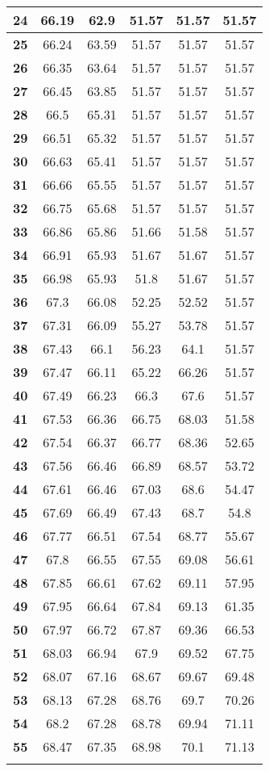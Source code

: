 \begin{longtable}{|c|c|c|c|c|c|}
\textbf{24} & 66.19 & 62.9 & 51.57 & 51.57 & 51.57 \\ \hline 
\textbf{25} & 66.24 & 63.59 & 51.57 & 51.57 & 51.57 \\ \hline 
\textbf{26} & 66.35 & 63.64 & 51.57 & 51.57 & 51.57 \\ \hline 
\textbf{27} & 66.45 & 63.85 & 51.57 & 51.57 & 51.57 \\ \hline 
\textbf{28} & 66.5 & 65.31 & 51.57 & 51.57 & 51.57 \\ \hline 
\textbf{29} & 66.51 & 65.32 & 51.57 & 51.57 & 51.57 \\ \hline 
\textbf{30} & 66.63 & 65.41 & 51.57 & 51.57 & 51.57 \\ \hline 
\textbf{31} & 66.66 & 65.55 & 51.57 & 51.57 & 51.57 \\ \hline 
\textbf{32} & 66.75 & 65.68 & 51.57 & 51.57 & 51.57 \\ \hline 
\textbf{33} & 66.86 & 65.86 & 51.66 & 51.58 & 51.57 \\ \hline 
\textbf{34} & 66.91 & 65.93 & 51.67 & 51.67 & 51.57 \\ \hline 
\textbf{35} & 66.98 & 65.93 & 51.8 & 51.67 & 51.57 \\ \hline 
\textbf{36} & 67.3 & 66.08 & 52.25 & 52.52 & 51.57 \\ \hline 
\textbf{37} & 67.31 & 66.09 & 55.27 & 53.78 & 51.57 \\ \hline 
\textbf{38} & 67.43 & 66.1 & 56.23 & 64.1 & 51.57 \\ \hline 
\textbf{39} & 67.47 & 66.11 & 65.22 & 66.26 & 51.57 \\ \hline 
\textbf{40} & 67.49 & 66.23 & 66.3 & 67.6 & 51.57 \\ \hline 
\textbf{41} & 67.53 & 66.36 & 66.75 & 68.03 & 51.58 \\ \hline 
\textbf{42} & 67.54 & 66.37 & 66.77 & 68.36 & 52.65 \\ \hline 
\textbf{43} & 67.56 & 66.46 & 66.89 & 68.57 & 53.72 \\ \hline 
\textbf{44} & 67.61 & 66.46 & 67.03 & 68.6 & 54.47 \\ \hline 
\textbf{45} & 67.69 & 66.49 & 67.43 & 68.7 & 54.8 \\ \hline 
\textbf{46} & 67.77 & 66.51 & 67.54 & 68.77 & 55.67 \\ \hline 
\textbf{47} & 67.8 & 66.55 & 67.55 & 69.08 & 56.61 \\ \hline 
\textbf{48} & 67.85 & 66.61 & 67.62 & 69.11 & 57.95 \\ \hline 
\textbf{49} & 67.95 & 66.64 & 67.84 & 69.13 & 61.35 \\ \hline 
\textbf{50} & 67.97 & 66.72 & 67.87 & 69.36 & 66.53 \\ \hline 
\textbf{51} & 68.03 & 66.94 & 67.9 & 69.52 & 67.75 \\ \hline 
\textbf{52} & 68.07 & 67.16 & 68.67 & 69.67 & 69.48 \\ \hline 
\textbf{53} & 68.13 & 67.28 & 68.76 & 69.7 & 70.26 \\ \hline 
\textbf{54} & 68.2 & 67.28 & 68.78 & 69.94 & 71.11 \\ \hline 
\textbf{55} & 68.47 & 67.35 & 68.98 & 70.1 & 71.13 \\ \hline 

    \caption[]{}
    \label{Tab:}
\end{longtable}